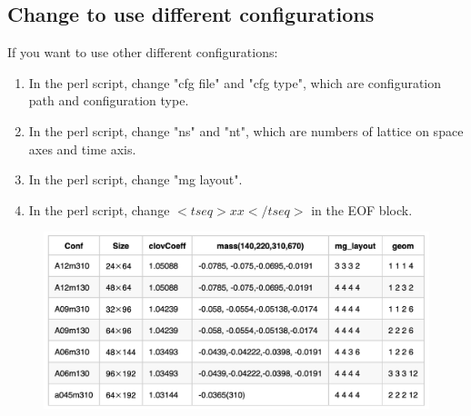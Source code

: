 \documentclass{article}
\begin{document}
\subsection{Change to use different configurations}

If you want to use other different configurations:

\begin{enumerate}
  \item In the perl script, change "cfg file" and "cfg type", which are configuration path and configuration type.
  \item In the perl script, change "ns" and "nt", which are numbers of lattice on space axes and time axis.
  \item In the perl script, change "mg layout".
  \item In the perl script, change $<tseq>xx</tseq>$ in the EOF block.
\end{enumerate}

\begin{figure}[h]
  \centering
  \includegraphics[scale=0.5]{configuration_set.png} 	
\end{figure} 
\end{document}
